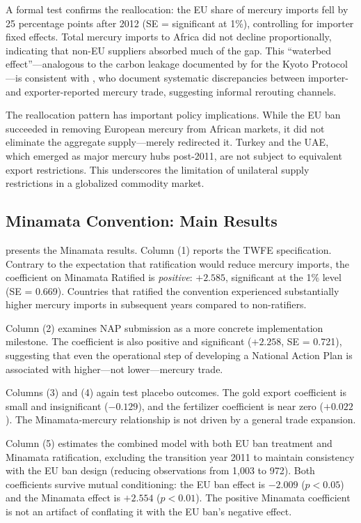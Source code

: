 \documentclass[12pt]{article}
\begin{document}
A formal test confirms the reallocation: the EU share of mercury imports fell by 25 percentage points after 2012 (SE = significant at 1\%), controlling for importer fixed effects. Total mercury imports to Africa did not decline proportionally, indicating that non-EU suppliers absorbed much of the gap. This ``waterbed effect''---analogous to the carbon leakage documented by \citet{aichele2012kyoto} for the Kyoto Protocol---is consistent with \citet{fritz2022smuggling}, who document systematic discrepancies between importer- and exporter-reported mercury trade, suggesting informal rerouting channels.

The reallocation pattern has important policy implications. While the EU ban succeeded in removing European mercury from African markets, it did not eliminate the aggregate supply---merely redirected it. Turkey and the UAE, which emerged as major mercury hubs post-2011, are not subject to equivalent export restrictions. This underscores the limitation of unilateral supply restrictions in a globalized commodity market.

\subsection{Minamata Convention: Main Results}

 presents the Minamata results. Column (1) reports the TWFE specification. Contrary to the expectation that ratification would reduce mercury imports, the coefficient on Minamata Ratified is \textit{positive}: $+2.585$, significant at the 1\% level (SE = 0.669). Countries that ratified the convention experienced substantially higher mercury imports in subsequent years compared to non-ratifiers.


\label{tab:minamata}

Column (2) examines NAP submission as a more concrete implementation milestone. The coefficient is also positive and significant ($+2.258$, SE = 0.721), suggesting that even the operational step of developing a National Action Plan is associated with higher---not lower---mercury trade.

Columns (3) and (4) again test placebo outcomes. The gold export coefficient is small and insignificant ($-0.129$), and the fertilizer coefficient is near zero ($+0.022$). The Minamata-mercury relationship is not driven by a general trade expansion.

Column (5) estimates the combined model with both EU ban treatment and Minamata ratification, excluding the transition year 2011 to maintain consistency with the EU ban design (reducing observations from 1,003 to 972). Both coefficients survive mutual conditioning: the EU ban effect is $-2.009$ ($p < 0.05$) and the Minamata effect is $+2.554$ ($p < 0.01$). The positive Minamata coefficient is not an artifact of conflating it with the EU ban's negative effect.
\end{document}
